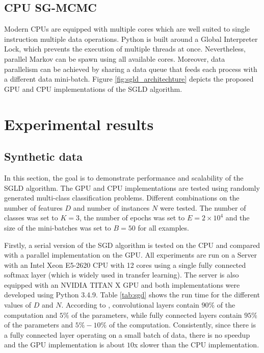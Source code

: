 \documentclass[9pt,lineno]{crone}
\begin{document}
 
\subsection{CPU SG-MCMC}
Modern CPUs are equipped with multiple cores which are well suited to single instruction multiple data operations. Python is built around a Global Interpreter Lock, which prevents the execution of multiple threads at once.  Nevertheless, parallel Markov can be spawn using all available cores.  Moreover, data parallelism can be achieved by sharing a data queue that feeds each process with a different data mini-batch.  Figure \ref{fig:sgld_architechture} depicts the proposed GPU and CPU implementations of the SGLD algorithm. 


\section{Experimental results}

\subsection{Synthetic data}
In this section, the goal is to demonstrate performance and scalability of the SGLD algorithm. The GPU and CPU implementations are tested using randomly generated multi-class classification problems. Different combinations on the number of features $D$ and number of instances $N$ were tested. The number of classes was set to $K=3$, the number of epochs was set to $E=2 \times 10^4$ and the size of the mini-batches was set to $B=50$ for all examples.

Firstly, a serial version  of the SGD algorithm is tested on the CPU and compared with a parallel implementation on the GPU. All experiments are run on a Server with an Intel Xeon E5-2620 CPU with 12 cores using a single fully connected softmax layer (which is widely used in transfer learning). The server is also equipped with an NVIDIA TITAN X GPU and both implementations were developed using Python 3.4.9. Table \ref{tab:sgd} shows the run time for the different values of $D$ and $N$. According to \cite{LI201695}, convolutional layers contain $90\%$ of the computation and $5\%$ of the parameters, while fully connected layers contain $95\%$ of the parameters and $5\%-10\%$ of the computation. Consistently, since there is a fully connected layer operating on a small batch of data, there is no speedup and the GPU implementation is about $10$x slower than the CPU implementation.
\end{document}
